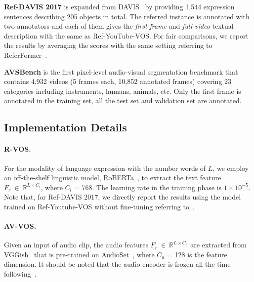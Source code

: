 \documentclass{article}
\begin{document}
\textbf{Ref-DAVIS 2017} is expanded from DAVIS~\cite{pont20172017} by providing 1,544 expression sentences describing 205 objects in total. The referred instance is annotated with two annotators and each of them gives the \textit{first-frame} and \textit{full-video} textual description with the same as Ref-YouTube-VOS. For fair comparisons, we report the results by averaging the scores with the same setting referring to ReferFormer~\cite{wu2022language}.

\textbf{AVSBench} is the first pixel-level audio-visual segmentation benchmark that contains 4,932 videos (5 frames each, 10,852 annotated frames) covering 23 categories including instruments, humans, animals, etc. Only the first frame is annotated in the training set, all the test set and validation set are annotated.

\subsection{Implementation Details}
\paragraph{R-VOS.} For the modality of language expression with the number words of $L$, we employ an off-the-shelf linguistic model, RoBERTa~\cite{liu2019roberta}, to extract the text feature ${F}_{r}~\in~\mathbb{R}^{L \times C_{l}}$, where $C_l$ = 768. The learning rate in the training phase is $1 \times 10^{-5}$. Note that, for Ref-DAVIS 2017, we directly report the results using the model trained on Ref-Youtube-VOS without fine-tuning referring to~\cite{wu2022language}.

\paragraph{AV-VOS.} Given an input of audio clip, the audio features ${F}_{r}~\in~\mathbb{R}^{L \times C_a}$ are extracted from  VGGish~\cite{hershey2017cnn} that is pre-trained on AudioSet~\cite{gemmeke2017audio}, where $C_a$ = 128 is the feature dimension. It should be noted that the audio encoder is frozen all the time following~\cite{zhou2022audio}.
\end{document}
